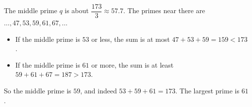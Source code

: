 The middle prime $q$ is about $\dfrac{173}{3}\approx57.7$. The primes near there are $\dots,47,53,59,61,67,\dots$
\begin{itemize}
\item If the middle prime is $53$ or less, the sum is at most $47+53+59=159<173$.
\item If the middle prime is $61$ or more, the sum is at least $59+61+67=187>173$.
\end{itemize}
So the middle prime is $59$, and indeed $53+59+61=173$. The largest prime is $\boxed{61}$.
